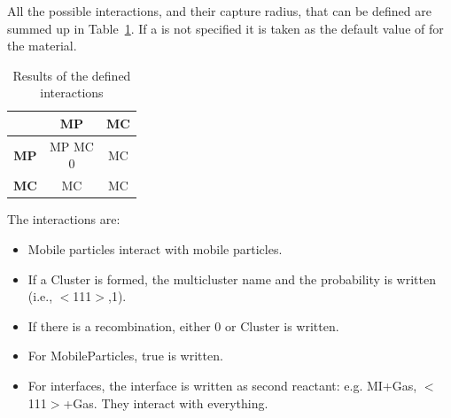 All the possible interactions, and their capture radius, that can be defined are summed up in Table~\ref{tab:possibleinteractions}. If a  is not specified it is taken as the default value of  for the material.

\begin{table}
\caption{Results of the defined interactions}
\label{tab:possibleinteractions}
\begin{center}
\begin{tabular}{|c||c|c|}
\hline
            & \textbf{MP}              & \textbf{MC}  \\\hline\hline
\textbf{MP} & \specialcell{MP MC\\ 0 } & MC           \\\hline
\textbf{MC} & MC                       & MC           \\\hline
\end{tabular}
\end{center}
\end{table}

The interactions are:

\begin{itemize}
\item Mobile particles interact with mobile particles.
\item If a Cluster is formed, the multicluster name and the probability is written (i.e., $<$111$>$,1).
\item If there is a recombination, either 0 or Cluster is written.
\item For MobileParticles, true is written.
\item For interfaces, the interface is written as second reactant: e.g. MI+Gas, $<$111$>$+Gas. They interact with everything.
\end{itemize}

